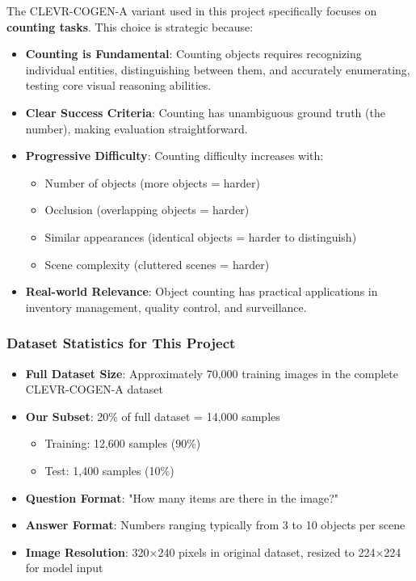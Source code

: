 \documentclass[conference]{IEEEtran}
\begin{document}
The CLEVR-COGEN-A variant used in this project specifically focuses on \textbf{counting tasks}. This choice is strategic because:

\begin{itemize}
    \item \textbf{Counting is Fundamental}: Counting objects requires recognizing individual entities, distinguishing between them, and accurately enumerating, testing core visual reasoning abilities.
    
    \item \textbf{Clear Success Criteria}: Counting has unambiguous ground truth (the number), making evaluation straightforward.
    
    \item \textbf{Progressive Difficulty}: Counting difficulty increases with:
    \begin{itemize}
        \item Number of objects (more objects = harder)
        \item Occlusion (overlapping objects = harder)
        \item Similar appearances (identical objects = harder to distinguish)
        \item Scene complexity (cluttered scenes = harder)
    \end{itemize}
    
    \item \textbf{Real-world Relevance}: Object counting has practical applications in inventory management, quality control, and surveillance.
\end{itemize}

\subsubsection{Dataset Statistics for This Project}

\begin{itemize}
    \item \textbf{Full Dataset Size}: Approximately 70,000 training images in the complete CLEVR-COGEN-A dataset
    \item \textbf{Our Subset}: 20\% of full dataset = 14,000 samples
    \begin{itemize}
        \item Training: 12,600 samples (90\%)
        \item Test: 1,400 samples (10\%)
    \end{itemize}
    \item \textbf{Question Format}: "How many items are there in the image?"
    \item \textbf{Answer Format}: Numbers ranging typically from 3 to 10 objects per scene
    \item \textbf{Image Resolution}: 320×240 pixels in original dataset, resized to 224×224 for model input
\end{itemize}
\end{document}
